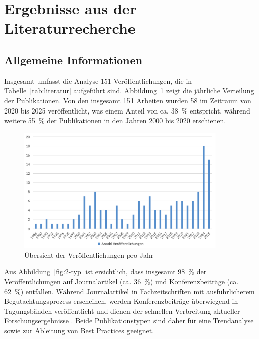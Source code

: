 \section{Ergebnisse aus der Literaturrecherche}\label{chap:results_lit}

\subsection{Allgemeine Informationen}

Insgesamt umfasst die Analyse 151 Veröffentlichungen, die in Tabelle~\ref{tab:literatur} aufgeführt sind. Abbildung~\ref{fig:1-veroeffentlichungen-jahr} zeigt die jährliche Verteilung der Publikationen. Von den insgesamt 151 Arbeiten wurden 58 im Zeitraum von 2020 bis 2025 veröffentlicht, was einem Anteil von ca. 38~\% entspricht, während weitere 55~\% der Publikationen in den Jahren 2000 bis 2020 erschienen.

\begin{figure}[!htbp]
    \centering
    \includegraphics[width=0.90\textwidth]{graphics_lit/1-veroeffentlichungen-jahr.png}
    \caption{Übersicht der Veröffentlichungen pro Jahr}
    \label{fig:1-veroeffentlichungen-jahr}
\end{figure}

Aus Abbildung~\ref{fig:2-typ} ist ersichtlich, dass insgesamt 98~\% der Veröffentlichungen auf Journalartikel (ca. 36~\%) und Konferenzbeiträge (ca. 62~\%) entfallen. Während Journalartikel in Fachzeitschriften mit ausführlicherem Begutachtungsprozess erscheinen, werden Konferenzbeiträge überwiegend in Tagungsbänden veröffentlicht und dienen der schnellen Verbreitung aktueller Forschungsergebnisse \cite{abbadia_conference_2022}. Beide Publikationstypen sind daher für eine Trendanalyse sowie zur Ableitung von Best Practices geeignet.

